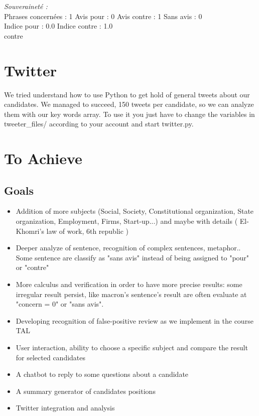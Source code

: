 \documentclass{article}
\begin{document}
\emph{Souveraineté : }\\
Phrases concernées : 1
Avis pour : 0
Avis contre : 1
Sans avis : 0\\
Indice pour : 0.0
Indice contre : 1.0
\\contre


\section{Twitter}
We tried understand how to use Python to get hold of general tweets about our candidates. We managed to succeed, 150 tweets per candidate, so we can analyze them with our key words array.
To use it you just have to change the variables in tweeter\_files/ according to your account and start twitter.py.

\section{To Achieve}
\subsection{Goals }
\begin{itemize}
    \item Addition of more subjects (Social, Society, Constitutional organization, State organization, Employment, Firms, Start-up...) and maybe with details ( El-Khomri's law of work, 6th republic )
    \item Deeper analyze of sentence, recognition of complex sentences, metaphor..\\
    Some sentence are classify as "sans avis" instead of being assigned to "pour" or "contre"
    
    \item More calculus and verification in order to have more precise results: some irregular result persist, like macron's sentence's result are often evaluate at "concern =  0" or "sans avis".
    
    \item Developing recognition of false-positive review as we implement in the course TAL
    \item User interaction, ability to choose a specific subject and compare the result for selected candidates
    \item A chatbot to reply to some questions about a candidate
    \item A summary generator of candidates positions
    \item Twitter integration and analysis
\end{itemize}
\end{document}
